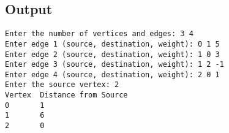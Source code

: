 \documentclass{korigamik}
\begin{document}
\subsection{Output}
\begin{lstlisting}[style=output]
Enter the number of vertices and edges: 3 4
Enter edge 1 (source, destination, weight): 0 1 5
Enter edge 2 (source, destination, weight): 1 0 3
Enter edge 3 (source, destination, weight): 1 2 -1
Enter edge 4 (source, destination, weight): 2 0 1
Enter the source vertex: 2
Vertex  Distance from Source
0       1
1       6
2       0
\end{lstlisting}
\end{document}
